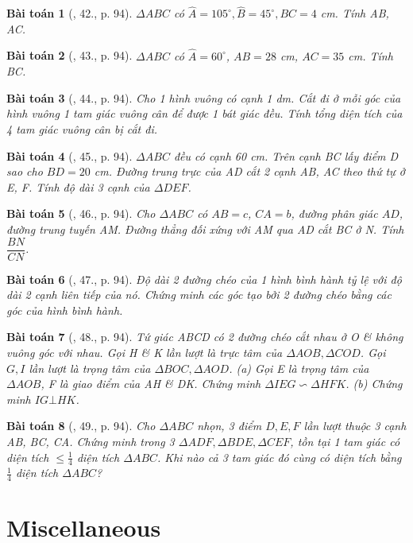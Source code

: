 \documentclass{article}
\newtheorem{baitoan}{Bài toán}
\begin{document}
\begin{baitoan}[\cite{Binh_Toan_9_tap_1}, 42., p. 94]
	$\Delta ABC$ có $\widehat{A} = 105^\circ,\widehat{B} = 45^\circ, BC = 4$ {\rm cm}. Tính AB, AC.
\end{baitoan}

\begin{baitoan}[\cite{Binh_Toan_9_tap_1}, 43., p. 94]
	$\Delta ABC$ có $\widehat{A} = 60^\circ$, $AB = 28$ {\rm cm}, $AC = 35$ {\rm cm}. Tính BC.
\end{baitoan}

\begin{baitoan}[\cite{Binh_Toan_9_tap_1}, 44., p. 94]
	Cho 1 hình vuông có cạnh {\rm1 dm}. Cắt đi ở mỗi góc của hình vuông 1 tam giác vuông cân để được 1 bát giác đều. Tính tổng diện tích của 4 tam giác vuông cân bị cắt đi.
\end{baitoan}

\begin{baitoan}[\cite{Binh_Toan_9_tap_1}, 45., p. 94]
	$\Delta ABC$ đều có cạnh {\rm60 cm}. Trên cạnh BC lấy điểm D sao cho $BD = 20$ {\rm cm}. Đường trung trực của AD cắt 2 cạnh AB, AC theo thứ tự ở E, F. Tính độ dài 3 cạnh của $\Delta DEF$.
\end{baitoan}

\begin{baitoan}[\cite{Binh_Toan_9_tap_1}, 46., p. 94]
	Cho $\Delta ABC$ có $AB = c$, $CA = b$, đường phân giác $AD$, đường trung tuyến AM. Đường thẳng đối xứng với AM qua AD cắt BC ở N. Tính $\dfrac{BN}{CN}$.
\end{baitoan}

\begin{baitoan}[\cite{Binh_Toan_9_tap_1}, 47., p. 94]
	Độ dài 2 đường chéo của 1 hình bình hành tỷ lệ với độ dài 2 cạnh liên tiếp của nó. Chứng minh các góc tạo bởi 2 đường chéo bằng các góc của hình bình hành.
\end{baitoan}

\begin{baitoan}[\cite{Binh_Toan_9_tap_1}, 48., p. 94]
	Tứ giác ABCD có 2 đường chéo cắt nhau ở O \& không vuông góc với nhau. Gọi H \& K lần lượt là trực tâm của $\Delta AOB,\Delta COD$. Gọi $G,I$ lần lượt là trọng tâm của $\Delta BOC,\Delta AOD$. (a) Gọi E là trọng tâm của $\Delta AOB$, F là giao điểm của AH \& DK. Chứng minh $\Delta IEG\backsim\Delta HFK$. (b) Chứng minh $IG\bot HK$.
\end{baitoan}

\begin{baitoan}[\cite{Binh_Toan_9_tap_1}, 49., p. 94]
	Cho $\Delta ABC$ nhọn, 3 điểm $D,E,F$ lần lượt thuộc 3 cạnh AB, BC, CA. Chứng minh trong 3 $\Delta ADF,\Delta BDE,\Delta CEF$, tồn tại 1 tam giác có diện tích $\le\frac{1}{4}$ diện tích $\Delta ABC$. Khi nào cả 3 tam giác đó cùng có diện tích bằng $\frac{1}{4}$ diện tích $\Delta ABC$?
\end{baitoan}


\section{Miscellaneous}


\printbibliography[heading=bibintoc]
	
\end{document}

